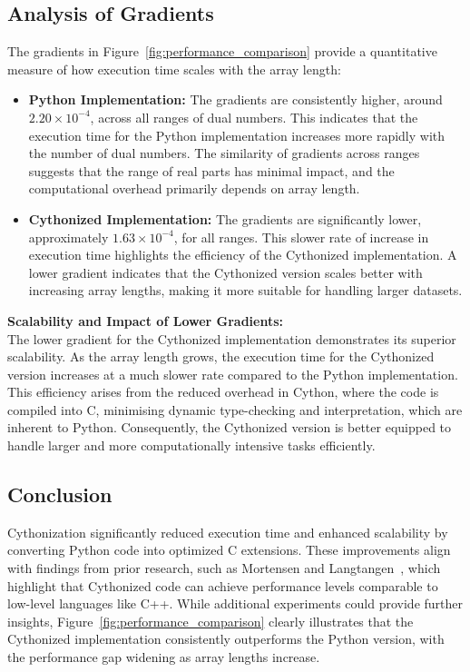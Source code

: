 \documentclass[a4paper,12pt]{article}
\begin{document}
\subsection{Analysis of Gradients}
The gradients in Figure~\ref{fig:performance_comparison} provide a quantitative measure of how execution time scales with the array length:

\begin{itemize}
    \item \textbf{Python Implementation:} The gradients are consistently higher, around \(2.20 \times 10^{-4}\), across all ranges of dual numbers. This indicates that the execution time for the Python implementation increases more rapidly with the number of dual numbers. The similarity of gradients across ranges suggests that the range of real parts has minimal impact, and the computational overhead primarily depends on array length.
    
    \item \textbf{Cythonized Implementation:} The gradients are significantly lower, approximately \(1.63 \times 10^{-4}\), for all ranges. This slower rate of increase in execution time highlights the efficiency of the Cythonized implementation. A lower gradient indicates that the Cythonized version scales better with increasing array lengths, making it more suitable for handling larger datasets.
\end{itemize}

\textbf{Scalability and Impact of Lower Gradients:} \\
The lower gradient for the Cythonized implementation demonstrates its superior scalability. As the array length grows, the execution time for the Cythonized version increases at a much slower rate compared to the Python implementation. This efficiency arises from the reduced overhead in Cython, where the code is compiled into C, minimising dynamic type-checking and interpretation, which are inherent to Python. Consequently, the Cythonized version is better equipped to handle larger and more computationally intensive tasks efficiently.

\subsection{Conclusion}
Cythonization significantly reduced execution time and enhanced scalability by converting Python code into optimized C extensions. These improvements align with findings from prior research, such as Mortensen and Langtangen~\cite{mortensen2016cython}, which highlight that Cythonized code can achieve performance levels comparable to low-level languages like C++. While additional experiments could provide further insights, Figure~\ref{fig:performance_comparison} clearly illustrates that the Cythonized implementation consistently outperforms the Python version, with the performance gap widening as array lengths increase.
\end{document}
